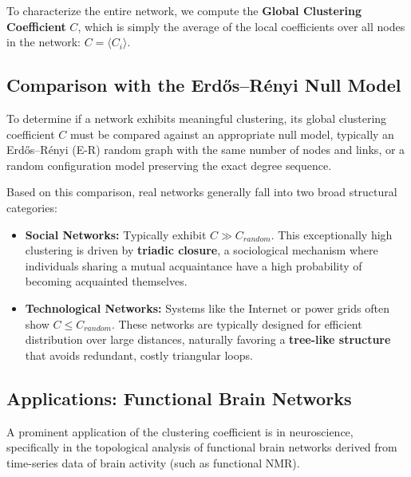 To characterize the entire network, we compute the \textbf{Global Clustering Coefficient} $C$, which is simply the average of the local coefficients over all nodes in the network: $C = \langle C_i \rangle$.

\subsection{Comparison with the Erdős–Rényi Null Model}

To determine if a network exhibits meaningful clustering, its global clustering coefficient $C$ must be compared against an appropriate null model, typically an Erdős–Rényi (E-R) random graph with the same number of nodes and links, or a random configuration model preserving the exact degree sequence.

Based on this comparison, real networks generally fall into two broad structural categories:
\begin{itemize}
    \item \textbf{Social Networks:} Typically exhibit $C \gg C_{random}$. This exceptionally high clustering is driven by \textbf{triadic closure}, a sociological mechanism where individuals sharing a mutual acquaintance have a high probability of becoming acquainted themselves.
    \item \textbf{Technological Networks:} Systems like the Internet or power grids often show $C \le C_{random}$. These networks are typically designed for efficient distribution over large distances, naturally favoring a \textbf{tree-like structure} that avoids redundant, costly triangular loops.
\end{itemize}

\subsection{Applications: Functional Brain Networks}

A prominent application of the clustering coefficient is in neuroscience, specifically in the topological analysis of functional brain networks derived from time-series data of brain activity (such as functional NMR).

